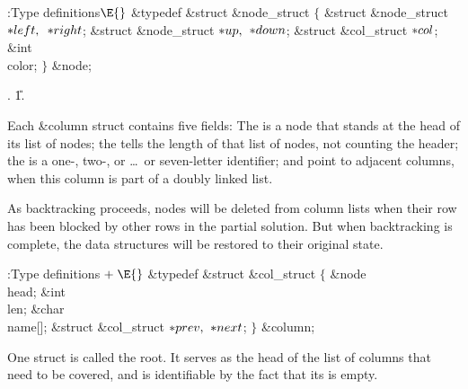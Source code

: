 \Y\B\4:Type definitions\X${}\E{}$\6
\&{typedef} \&{struct} \&{node\_struct} ${}\{{}$\1\6
\&{struct} \&{node\_struct} ${}{*}\\{left},{}$ ${}{*}\\{right}{}$;\6
\&{struct} \&{node\_struct} ${}{*}\\{up},{}$ ${}{*}\\{down}{}$;\6
\&{struct} \&{col\_struct} ${}{*}\\{col}{}$;\6
\&{int} \\{color};\2\6
${}\}{}$ \&{node};\par
{}.
\U1.\fi

Each \&{column} struct contains five fields:
The  is a node that stands at the head of its list of nodes;
the  tells the length of that list of nodes, not counting the
header;
the  is a one-, two-, or \dots\ or seven-letter identifier;
 and  point to adjacent columns, when this
column is part of a doubly linked list.

As backtracking proceeds, nodes
will be deleted from column lists when their row has been blocked by
other rows in the partial solution.
But when backtracking is complete, the data structures will be
restored to their original state.

\Y\B\4:Type definitions\X${}\mathrel+\E{}$\6
\&{typedef} \&{struct} \&{col\_struct} ${}\{{}$\1\6
\&{node} \\{head};\6
\&{int} \\{len};\6
\&{char} \\{name}[];\6
\&{struct} \&{col\_struct} ${}{*}\\{prev},{}$ ${}{*}\\{next}{}$;\2\6
${}\}{}$ \&{column};\par
\fi

One  struct is called the root. It serves as
the head of the
list of columns that need to be covered, and is identifiable by the fact
that its  is empty.

